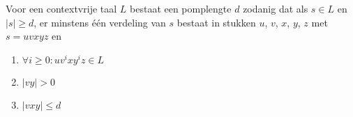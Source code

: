   Voor een contextvrije taal $L$ bestaat een pomplengte $d$ zodanig dat als $s \in L$ en $|s| \geq d$, er minstens \'e\'en verdeling van $s$ bestaat in stukken $u$, $v$, $x$, $y$, $z$ met $s = uvxyz$ en
  \begin{enumerate}
  \item $\forall i \geq 0: uv^ixy^iz \in L$
  \item $|vy| > 0$
  \item $|vxy| \leq d$
  \end{enumerate}